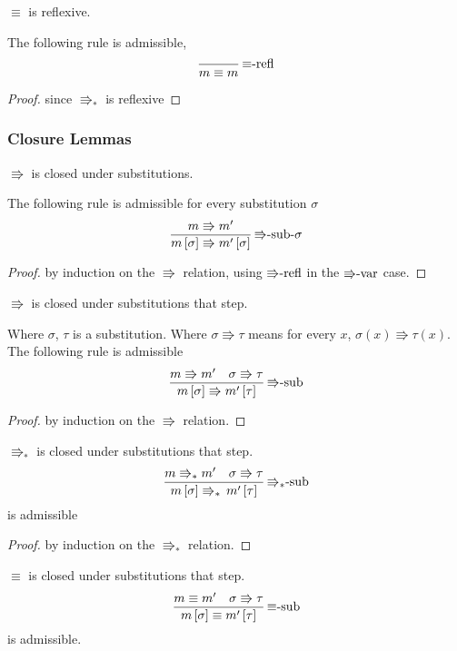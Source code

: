 \begin{lem}
$\equiv$ is reflexive.

The following rule is admissible,
\[
\frac{\,}{m\equiv m}\,\textrm{\ensuremath{\equiv}-refl}
\]
\end{lem}

\begin{proof}
since $\Rrightarrow_{\ast}$ is reflexive
\end{proof}

\subsubsection{Closure Lemmas}
\begin{lem}
$\Rrightarrow$ is closed under substitutions.

The following rule is admissible for every substitution $\sigma$
\[
\frac{m\Rrightarrow m'}{m\left[\sigma\right]\Rrightarrow m'\left[\sigma\right]}\,\textrm{\ensuremath{\Rrightarrow}-sub-\ensuremath{\sigma}}
\]
\end{lem}


\begin{proof}
by induction on the $\Rrightarrow$ relation, using $\textrm{\ensuremath{\Rrightarrow}-refl}$
in the $\textrm{\ensuremath{\Rrightarrow}-var}$ case.
\end{proof}
\begin{lem}
$\Rrightarrow$ is closed under substitutions that step.

Where $\sigma$, $\tau$ is a substitution.
Where $\sigma\Rrightarrow\tau$ means for every $x$, $\sigma\left(x\right)\Rrightarrow\tau\left(x\right)$.
The following rule is admissible
\[
\frac{m\Rrightarrow m'\quad\sigma\Rrightarrow\tau}{m\left[\sigma\right]\Rrightarrow m'\left[\tau\right]}\,\textrm{\ensuremath{\Rrightarrow}-sub}
\]
\end{lem}
\begin{proof}
by induction on the $\Rrightarrow$ relation.
\end{proof}

\begin{lem}
$\Rrightarrow_{\ast}$ is closed under substitutions that step.
\[
\frac{m\Rrightarrow_{\ast}m'\quad\sigma\Rrightarrow\tau}{m\left[\sigma\right]\Rrightarrow_{\ast}\,m'\left[\tau\right]}\,\textrm{\ensuremath{\Rrightarrow_{\ast}}-sub}
\]
is admissible 
\end{lem}

\begin{proof}
by induction on the $\Rrightarrow_{\ast}$ relation. 
\end{proof}
\begin{lem}
$\equiv$ is closed under substitutions that step.
\[
\frac{m\equiv m'\quad\sigma\Rrightarrow\tau}{m\left[\sigma\right]\equiv m'\left[\tau\right]}\,\textrm{\ensuremath{\equiv}-sub}
\]
is admissible.
\end{lem}


